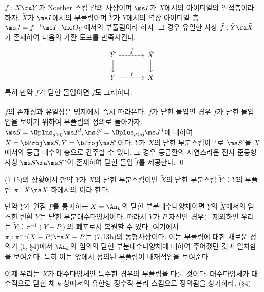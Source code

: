 	
	\begin{corollary}
	$f:X\ra Y$가 Noether 스킴 간의 사상이며 $\ms I$가 $X$에서의 아이디얼의 연접층이라 하자. $\tilde X$가 $\ms I$에서의 부풀림이며
	$\tilde Y$가 $Y$에서의 역상 아이디얼 층 $\ms J=f^{-1}\ms I\cdot\mc O_Y$에서의 부풀림이라 하자.
	그 경우 유일한 사상 $\tilde f:\tilde Y\ra\tilde X$가 존재하여 다음의 가환 도표를 만족시킨다.
	$$\begin{tikzcd}[column sep=large]
	\tilde Y\arrow[r,"\tilde f",dashed]\arrow[d]&\tilde X\arrow[d]\\Y\arrow[r,"f"]&X\end{tikzcd}$$
	특히 만약 $f$가 닫힌 몰입이면 $\tilde f$도 그러하다.\\\\
	\pf $\tilde f$의 존재성과 유일성은 명제에서 즉시 따라온다.
	$f$가 닫힌 몰입인 경우 $\tilde f$가 닫힌 몰입임을 보이기 위하여 부풀림의 정의로 돌아가자.
	$\ms S=\Oplus_{d\ge 0}\ms I^d,\ms S'=\Oplus_{d\ge 0}\ms J^d$에 대하여 $\tilde X=\bProj\ms S,\tilde Y=\bProj\ms S'$이다.
	$Y$가 $X$의 닫힌 부분스킴이므로 $\ms S'$을 $X$에서의 등급 대수의 층으로 간주할 수 있다.
	그 경우 등급환의 자연스러운 전사 준동형사상 $\ms S\ra\ms S"$이 존재하여 닫힌 몰입 $\tilde f$를 제공한다.
	\qed
	\end{corollary}
	
	
	\begin{definition}
	(7.15)의 상황에서 만약 $Y$가 $X$의 닫힌 부분스킴이면 $\tilde X$의 닫힌 부분스킴 $\tilde Y$를
	$Y$의 부풀림 $\pi:\tilde X\ra X$ 하에서의 이라 한다.
	\end{definition}
	
	
	\begin{example}
	만약 $Y$가 원점 $P$를 통과하는 $X=\An_k$의 닫힌 부분대수다양체이면
	$Y$의 $\tilde X$에서의 엄격한 변환 $\tilde Y$는 닫힌 부분대수다양체이다.
	따라서 $Y$가 $P$ 자신인 경우를 제외하면 우리는 $\tilde Y$를 $\pi^{-1}(Y-P)$의 폐포로서 복원할 수 있다.
	여기에서 $\pi:\pi^{-1}(X-P)\ra X-P$는 (7.13b)의 동형사상이다.
	이는 부풀림에 대한 새로운 정의가 (I, \S 4)에서 $\An_k$의 임의의 닫힌 부분대수다양체에 대하여 주어졌던 것과 일치함을 보여준다.
	특히 이는 앞에서 정의된 부풀림이 내재적임을 보여준다.
	\end{example}
	
	이제 우리는 $X$가 대수다양체인 특수한 경우의 부풀림을 다룰 것이다.
	대수다양체가 대수적으로 닫힌 체 $k$ 상에서의 유한형 정수적 분리 스킴으로 정의됨을 상기하라. (\S 4)
	
